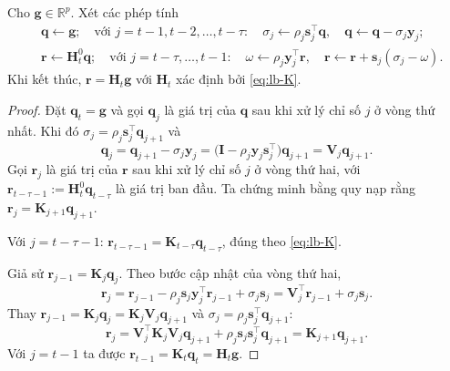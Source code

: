 \begin{proposition}\label{prop:lb-twoloop}
Cho $\mathbf{g}\in\mathbb{R}^{p}$. Xét các phép tính
\begin{align*}
  &\mathbf{q}\leftarrow\mathbf{g};\quad\text{với }j=t-1,t-2,\dots,t-\tau:\quad \sigma_j\leftarrow\rho_j\mathbf{s}_j^{\top}\mathbf{q},\quad \mathbf{q}\leftarrow\mathbf{q}-\sigma_j\mathbf{y}_j;\\
  &\mathbf{r}\leftarrow\mathbf{H}_t^{0}\mathbf{q};\quad\text{với }j=t-\tau,\dots,t-1:\quad \omega\leftarrow\rho_j\mathbf{y}_j^{\top}\mathbf{r},\quad \mathbf{r}\leftarrow\mathbf{r}+\mathbf{s}_j(\sigma_j-\omega).
\end{align*}
Khi kết thúc, $\mathbf{r}=\mathbf{H}_t\mathbf{g}$ với $\mathbf{H}_t$ xác định bởi \eqref{eq:lb-K}.
\end{proposition}

\begin{proof}
Đặt $\mathbf{q}_t=\mathbf{g}$ và gọi $\mathbf{q}_j$ là giá trị của $\mathbf{q}$ sau khi xử lý chỉ số $j$ ở vòng thứ nhất. Khi đó $\sigma_j=\rho_j\mathbf{s}_j^{\top}\mathbf{q}_{j+1}$ và
\begin{equation*}
  \mathbf{q}_j=\mathbf{q}_{j+1}-\sigma_j\mathbf{y}_j=\big(\mathbf{I}-\rho_j\mathbf{y}_j\mathbf{s}_j^{\top}\big)\mathbf{q}_{j+1}=\mathbf{V}_j\mathbf{q}_{j+1}.
\end{equation*}
Gọi $\mathbf{r}_j$ là giá trị của $\mathbf{r}$ sau khi xử lý chỉ số $j$ ở vòng thứ hai, với $\mathbf{r}_{t-\tau-1}:=\mathbf{H}_t^{0}\mathbf{q}_{t-\tau}$ là giá trị ban đầu. Ta chứng minh bằng quy nạp rằng $\mathbf{r}_j=\mathbf{K}_{j+1}\mathbf{q}_{j+1}$.

Với $j=t-\tau-1$: $\mathbf{r}_{t-\tau-1}=\mathbf{K}_{t-\tau}\mathbf{q}_{t-\tau}$, đúng theo \eqref{eq:lb-K}.

Giả sử $\mathbf{r}_{j-1}=\mathbf{K}_{j}\mathbf{q}_{j}$. Theo bước cập nhật của vòng thứ hai,
\begin{equation*}
  \mathbf{r}_j=\mathbf{r}_{j-1}-\rho_j\mathbf{s}_j\mathbf{y}_j^{\top}\mathbf{r}_{j-1}+\sigma_j\mathbf{s}_j=\mathbf{V}_j^{\top}\mathbf{r}_{j-1}+\sigma_j\mathbf{s}_j .
\end{equation*}
Thay $\mathbf{r}_{j-1}=\mathbf{K}_j\mathbf{q}_j=\mathbf{K}_j\mathbf{V}_j\mathbf{q}_{j+1}$ và $\sigma_j=\rho_j\mathbf{s}_j^{\top}\mathbf{q}_{j+1}$:
\begin{equation*}
  \mathbf{r}_j=\mathbf{V}_j^{\top}\mathbf{K}_j\mathbf{V}_j\mathbf{q}_{j+1}+\rho_j\mathbf{s}_j\mathbf{s}_j^{\top}\mathbf{q}_{j+1}=\mathbf{K}_{j+1}\mathbf{q}_{j+1}.
\end{equation*}
Với $j=t-1$ ta được $\mathbf{r}_{t-1}=\mathbf{K}_t\mathbf{q}_t=\mathbf{H}_t\mathbf{g}$.
\end{proof}

